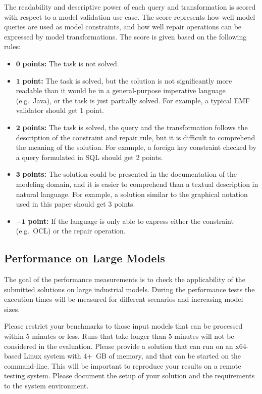 \documentclass[submission,copyright,creativecommons]{eptcs}
\begin{document}
The readability and descriptive power of each query and transformation is scored with respect to a model validation use case. The score represents how well model queries are used as model constraints, and how well repair operations can be expressed by model transformations. The score is given based on the following rules:
\begin{itemize}
	\item $\mathbf{0}$   \textbf{points:} The task is not solved.
	\item $\mathbf{1}$   \textbf{point:} The task is solved, but the solution is not significantly more readable than it would be in a general-purpose imperative language (e.g.\ Java), or the task is just partially solved. For example, a typical EMF validator should get 1 point.
	\item $\mathbf{2}$   \textbf{points:} The task is solved, the query and the transformation follows the description of the constraint and repair rule, but it is difficult to comprehend the meaning of the solution. For example, a foreign key constraint checked by a query formulated in SQL should get 2 points.
	\item $\mathbf{3}$   \textbf{points:} The solution could be presented in the documentation of the modeling domain, and it is easier to comprehend than a textual description in natural language. For example, a solution similar to the graphical notation used in this paper should get 3 points.
	\item $\mathbf{-1}$  \textbf{point:} If the language is only able to express either the constraint (e.g.\ OCL) or the repair operation.
\end{itemize}

\noindent{}

\subsection{Performance on Large Models}
The goal of the performance measurements is to check the applicability of the submitted solutions on large industrial models. During the performance tests the execution times will be measured for different scenarios and increasing model sizes.

Please restrict your benchmarks to those input models that can be processed within 5 minutes or less. Runs that take longer than 5 minutes will not be considered in the evaluation. Please provide a solution that can run on an x64-based Linux system with 4+~GB of memory, and that can be started on the command-line. This will be important to reproduce your results on a remote testing system. Please document the setup of your solution and the requirements to the system environment.
\end{document}
